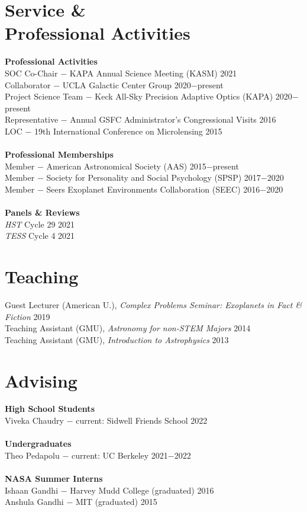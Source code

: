 \documentclass[margin,line]{cv}
\begin{document}
\begin{resume}
\section{\sc Service \&\\ Professional Activities}
\textbf{Professional Activities}\\
SOC Co-Chair $-$ KAPA Annual Science Meeting (KASM) \hfill 2021\\
Collaborator $-$ UCLA Galactic Center Group \hfill 2020$-$present\\
Project Science Team $-$ Keck All-Sky Precision Adaptive Optics (KAPA) \hfill 2020$-$present\\
Representative $-$ Annual GSFC Administrator's Congressional Visits \hfill 2016\\
LOC $-$ 19th International Conference on Microlensing \hfill 2015\\
\\
\textbf{Professional Memberships}\\
Member $-$ American Astronomical Society (AAS) \hfill 2015$-$present\\
Member $-$ Society for Personality and Social Psychology (SPSP) \hfill 2017$-$2020\\
Member $-$ Seers Exoplanet Environments Collaboration (SEEC) \hfill 2016$-$2020\\
\\
\textbf{Panels \& Reviews}\\
\textit{HST} Cycle 29 \hfill 2021\\
\textit{TESS} Cycle 4 \hfill 2021\\

\section{\sc Teaching}
Guest Lecturer (American U.), \textit{Complex Problems Seminar: Exoplanets in Fact \& Fiction} \hfill 2019 \\
Teaching Assistant (GMU), \textit{Astronomy for non-STEM Majors} \hfill 2014 \\
Teaching Assistant (GMU), \textit{Introduction to Astrophysics} \hfill 2013 \\

\section{\sc Advising}
\textbf{High School Students} \\
Viveka Chaudry $-$ current: Sidwell Friends School \hfill 2022 \\
\\
\textbf{Undergraduates} \\
Theo Pedapolu $-$ current: UC Berkeley \hfill 2021$-$2022 \\
\\
\textbf{NASA Summer Interns} \\
Ishaan Gandhi $-$ Harvey Mudd College (graduated) \hfill 2016 \\
Anshula Gandhi $-$ MIT (graduated) \hfill 2015\\


\end{resume}
\end{document}
